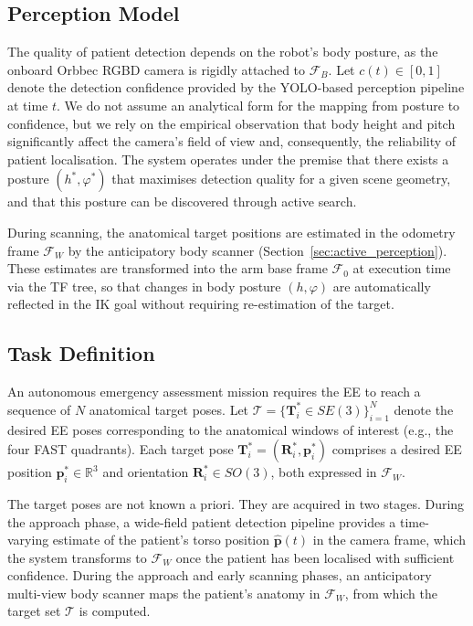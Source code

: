 \subsection{Perception Model}

The quality of patient detection depends on the robot's body posture, as
the onboard Orbbec \ac{RGBD} camera is rigidly attached to $\mathcal{F}_B$.
Let $c(t) \in [0, 1]$ denote the detection confidence provided by the
\ac{YOLO}-based perception pipeline at time $t$. We do not assume an
analytical form for the mapping from posture to confidence, but we rely on
the empirical observation that body height and pitch significantly affect
the camera's field of view and, consequently, the reliability of patient
localisation. The system operates under the premise that there exists a
posture $(h^*, \varphi^*)$ that maximises detection quality for a given
scene geometry, and that this posture can be discovered through active
search.

During scanning, the anatomical target positions are estimated in the
odometry frame $\mathcal{F}_W$ by the anticipatory body scanner
(Section~\ref{sec:active_perception}). These estimates are transformed into
the arm base frame $\mathcal{F}_0$ at execution time via the \ac{TF} tree,
so that changes in body posture $(h, \varphi)$ are automatically reflected
in the \ac{IK} goal without requiring re-estimation of the target.

\subsection{Task Definition}

An autonomous emergency assessment mission requires the \ac{EE} to reach a
sequence of $N$ anatomical target poses. Let
$\mathcal{T} = \{\mathbf{T}_i^* \in SE(3)\}_{i=1}^{N}$ denote the desired
\ac{EE} poses corresponding to the anatomical windows of interest (e.g., the
four \ac{FAST} quadrants). Each target pose
$\mathbf{T}_i^* = (\mathbf{R}_i^*, \mathbf{p}_i^*)$ comprises a desired
\ac{EE} position $\mathbf{p}_i^* \in \mathbb{R}^3$ and orientation
$\mathbf{R}_i^* \in SO(3)$, both expressed in $\mathcal{F}_W$.

The target poses are not known a priori. They are acquired in two stages.
During the approach phase, a wide-field patient detection pipeline provides a
time-varying estimate of the patient's torso position $\hat{\mathbf{p}}(t)$
in the camera frame, which the system transforms to $\mathcal{F}_W$ once the
patient has been localised with sufficient confidence. During the approach
and early scanning phases, an anticipatory multi-view body scanner maps the
patient's anatomy in $\mathcal{F}_W$, from which the target set $\mathcal{T}$
is computed.

